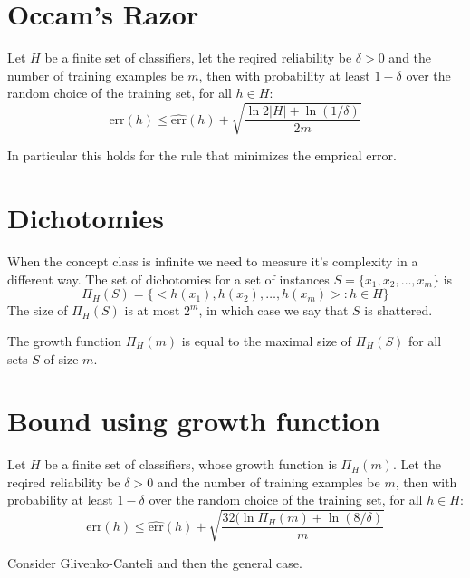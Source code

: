 \documentclass{report}
\theoremstyle{plain}
\theoremstyle{definition}
\begin{document}
\lecturer{}
\scribe{}

\maketitle

\section{Occam's  Razor}

\newcommand{\err}{\mbox{err}}
\newcommand{\errhat}{\widehat{\mbox{err}}}

Let $H$ be a finite set of classifiers, let the reqired reliability be
$\delta>0$ and the number of training examples be $m$, then with
probability at least $1-\delta$ over the random choice of the training
set, for all $h \in H$:
\[
\err(h) \leq \errhat(h) +  \sqrt{\frac{\ln 2|H| + \ln (1/\delta)}{2m} }
\]

In particular this holds for the rule that minimizes the emprical error.

\section{Dichotomies}

When the concept class is infinite we need to measure it's complexity
in a different way. The set of dichotomies for a set of instances
$S=\{x_1,x_2,\ldots,x_m\}$ is 
\[
\Pi_H(S) = \{ <h(x_1),h(x_2),\ldots,h(x_m)> : h \in H \}
\]
The size of $\Pi_H(S)$ is at most $2^m$, in which case we say that $S$
is shattered.

The growth function $\Pi_H(m)$ is equal to the maximal size of $\Pi_H(S)$ for all sets
$S$ of size $m$.

\section{Bound using growth function}

Let $H$ be a finite set of classifiers, whose growth function is
$\Pi_H(m)$.  Let the reqired reliability be $\delta>0$ and the number
of training examples be $m$, then with probability at least $1-\delta$
over the random choice of the training set, for all $h \in H$:
\[
\err(h) \leq \errhat(h) +  \sqrt{\frac{32(\ln \Pi_H(m) + \ln (8/\delta)}{m} }
\]

Consider Glivenko-Canteli and then the general case.
\end{document}
